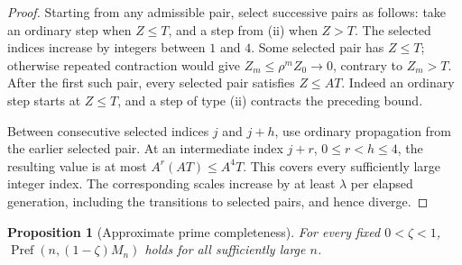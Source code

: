 \documentclass[11pt,letterpaper]{article}
\numberwithin{equation}{section}
\newtheorem{proposition}[theorem]{Proposition}
\theoremstyle{definition}
\theoremstyle{remark}
\DeclareMathOperator{\Pref}{Pref}
\begin{document}
\begin{proof}
Starting from any admissible pair, select successive pairs as follows:
take an ordinary step when $Z\le T$, and a step from (ii) when $Z>T$.
The selected indices increase by integers between $1$ and $4$.
Some selected pair has $Z\le T$; otherwise repeated contraction would
give $Z_m\le\rho^mZ_0\to0$, contrary to $Z_m>T$.
After the first such pair, every selected pair satisfies $Z\le AT$.
Indeed an ordinary step starts at $Z\le T$, and a step of type (ii)
contracts the preceding bound.

Between consecutive selected indices $j$ and $j+h$, use ordinary
propagation from the earlier selected pair. At an intermediate index
$j+r$, $0\le r<h\le4$, the resulting value is at most
$A^r(AT)\le A^4T$. This covers every sufficiently large integer index.
The corresponding scales increase by at least $\lambda$ per elapsed
generation, including the transitions to selected pairs, and hence diverge.
\end{proof}

\begin{proposition}[Approximate prime completeness]\label{prop:complete}
For every fixed $0<\zeta<1$, $\Pref(n,(1-\zeta)M_n)$ holds for all
sufficiently large $n$.
\end{proposition}
\end{document}
